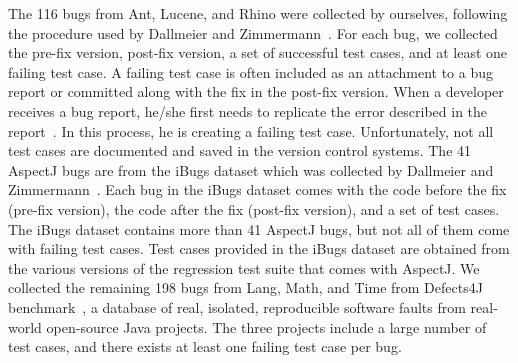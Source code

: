 The 116 bugs from Ant, Lucene, and Rhino were collected by ourselves, following the procedure used by Dallmeier and Zimmermann~\cite{DallmeierZ07}. For each bug, we collected the pre-fix version, post-fix version, a set of successful test cases, and at least one failing test case. A failing test case is often included as an attachment to a bug report or committed along with the fix in the post-fix version. When a developer receives a bug report, he/she first needs to replicate the error described in the report~\cite{worksforme}. In this process, he is creating a failing test case. Unfortunately, not all test cases are documented and saved in the version control systems. The 41 AspectJ bugs are from the iBugs dataset which was collected by Dallmeier and Zimmermann~\cite{DallmeierZ07}. Each bug in the iBugs dataset comes with the code before the fix (pre-fix version), the code after the fix (post-fix version), and a set of test cases. The iBugs dataset contains more than 41 AspectJ bugs, but not all of them come with failing test cases. Test cases provided in the iBugs dataset are obtained from the various versions of the regression test suite that comes with AspectJ. We collected the remaining 198 bugs from Lang, Math, and Time from Defects4J benchmark~\cite{Just:2014:DDE:2610384.2628055}, a database of real, isolated, reproducible software faults from real-world open-source Java projects. The three projects include a large number of test cases, and there exists at least one failing test case per bug. 





